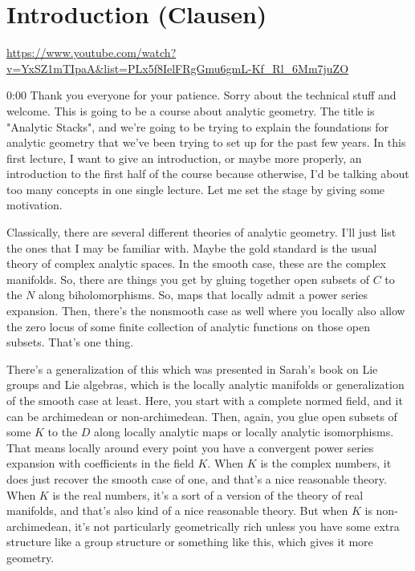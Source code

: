 
\section{\ufs Introduction (Clausen)}

\url{https://www.youtube.com/watch?v=YxSZ1mTIpaA&list=PLx5f8IelFRgGmu6gmL-Kf_Rl_6Mm7juZO}
\renewcommand{\yt}[2]{\href{https://www.youtube.com/watch?v=YxSZ1mTIpaA&list=PLx5f8IelFRgGmu6gmL-Kf_Rl_6Mm7juZO&t=#1}{#2}}
\vspace{1em}

\begin{unfinished}{0:00}
  Thank you everyone for your patience. Sorry about the technical stuff and welcome. This is going to be a course about analytic geometry. The title is "Analytic Stacks", and we're going to be trying to explain the foundations for analytic geometry that we've been trying to set up for the past few years. In this first lecture, I want to give an introduction, or maybe more properly, an introduction to the first half of the course because otherwise, I'd be talking about too many concepts in one single lecture. Let me set the stage by giving some motivation.

Classically, there are several different theories of analytic geometry. I'll just list the ones that I may be familiar with. Maybe the gold standard is the usual theory of complex analytic spaces. In the smooth case, these are the complex manifolds. So, there are things you get by gluing together open subsets of $C$ to the $N$ along biholomorphisms. So, maps that locally admit a power series expansion. Then, there's the nonsmooth case as well where you locally also allow the zero locus of some finite collection of analytic functions on those open subsets. That's one thing.

There's a generalization of this which was presented in Sarah's book on Lie groups and Lie algebras, which is the locally analytic manifolds or generalization of the smooth case at least. Here, you start with a complete normed field, and it can be archimedean or non-archimedean. Then, again, you glue open subsets of some $K$ to the $D$ along locally analytic maps or locally analytic isomorphisms. That means locally around every point you have a convergent power series expansion with coefficients in the field $K$. When $K$ is the complex numbers, it does just recover the smooth case of one, and that's a nice reasonable theory. When $K$ is the real numbers, it's a sort of a version of the theory of real manifolds, and that's also kind of a nice reasonable theory. But when $K$ is non-archimedean, it's not particularly geometrically rich unless you have some extra structure like a group structure or something like this, which gives it more geometry.


\end{unfinished}
